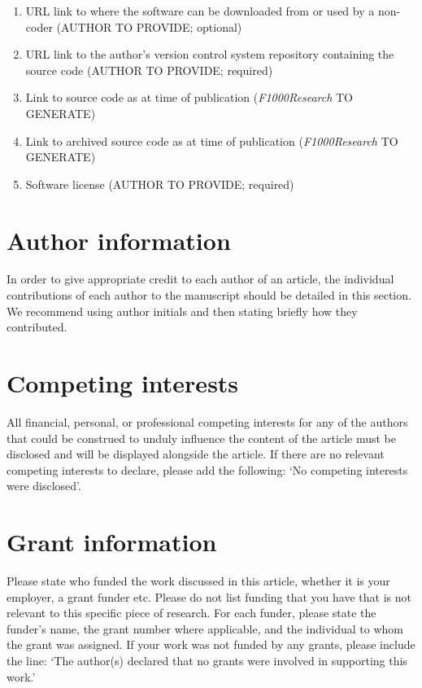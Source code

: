 \documentclass[9pt,a4paper,]{extarticle}
\begin{document}
\begin{enumerate}
\def\labelenumi{\arabic{enumi}.}
\item
  URL link to where the software can be downloaded from or used by a non-coder (AUTHOR TO PROVIDE; optional)
\item
  URL link to the author's version control system repository containing the source code (AUTHOR TO PROVIDE; required)
\item
  Link to source code as at time of publication (\emph{F1000Research} TO GENERATE)
\item
  Link to archived source code as at time of publication (\emph{F1000Research} TO GENERATE)
\item
  Software license (AUTHOR TO PROVIDE; required)
\end{enumerate}

\hypertarget{author-information}{%
\section{Author information}\label{author-information}}

In order to give appropriate credit to each author of an article, the individual contributions of each author to the manuscript should be detailed in this section. We recommend using author initials and then stating briefly how they contributed.

\hypertarget{competing-interests}{%
\section{Competing interests}\label{competing-interests}}

All financial, personal, or professional competing interests for any of the authors that could be construed to unduly influence the content of the article must be disclosed and will be displayed alongside the article. If there are no relevant competing interests to declare, please add the following: `No competing interests were disclosed'.

\hypertarget{grant-information}{%
\section{Grant information}\label{grant-information}}

Please state who funded the work discussed in this article, whether it is your employer, a grant funder etc. Please do not list funding that you have that is not relevant to this specific piece of research. For each funder, please state the funder's name, the grant number where applicable, and the individual to whom the grant was assigned. If your work was not funded by any grants, please include the line: `The author(s) declared that no grants were involved in supporting this work.'
\end{document}
